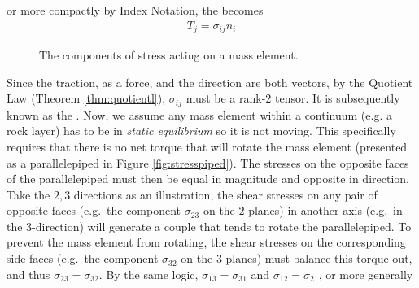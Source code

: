 or more compactly by Index Notation, the  becomes
\begin{align}
T_j = \sigma_{ij}n_i \label{eqn:Cauchyform}
\end{align}
\begin{figure}
    \centering
    \caption{The components of stress acting on a mass element.}
    \label{fig:stresscube}
\end{figure}
Since the traction, as a force, and the direction are both vectors, by the Quotient Law (Theorem \ref{thm:quotientl}), $\sigma_{ij}$ must be a rank-$2$ tensor. It is subsequently known as the . Now, we assume any mass element within a continuum (e.g. a rock layer) has to be in \textit{static equilibrium} so it is not moving. This specifically requires that there is no net torque that will rotate the mass element (presented as a parallelepiped in Figure \ref{fig:stresspiped}). The stresses on the opposite faces of the parallelepiped must then be equal in magnitude and opposite in direction. Take the $2,3$ directions as an illustration, the shear stresses on any pair of opposite faces (e.g.\ the component $\sigma_{23}$ on the $2$-planes) in another axis (e.g.\ in the $3$-direction) will generate a couple that tends to rotate the parallelepiped. To prevent the mass element from rotating, the shear stresses on the corresponding side faces (e.g.\ the component $\sigma_{32}$ on the $3$-planes) must balance this torque out, and thus $\sigma_{23} = \sigma_{32}$. By the same logic, $\sigma_{13} = \sigma_{31}$ and $\sigma_{12} = \sigma_{21}$, or more generally
